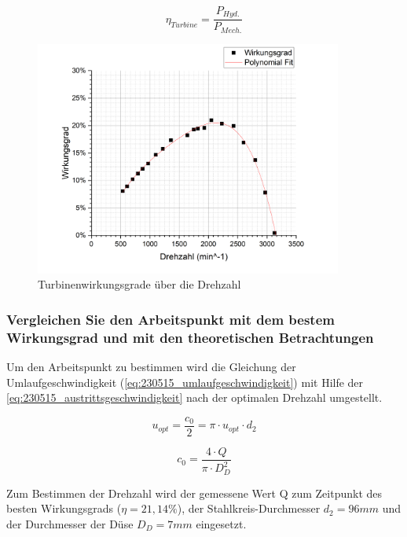 \begin{equation}
  \eta_{Turbine} = \frac{P_{Hyd.}}{P_{Mech.}}
  \label{eq:230512_Turbinenwirkungsgrad}
\end{equation}

\begin{figure}[H]
  \centering
  \includegraphics[width=0.9\textwidth]{Abbildungen/Wirkungsgrade.png}
  \caption{Turbinenwirkungsgrade über die Drehzahl}
  \label{fig:230514_Wirkungsgrade}
\end{figure}

\subsubsection{Vergleichen Sie den Arbeitspunkt mit dem bestem Wirkungsgrad und mit den theoretischen Betrachtungen}

Um den Arbeitspunkt zu bestimmen wird die Gleichung der Umlaufgeschwindigkeit (\autoref{eq:230515_umlaufgeschwindigkeit}) mit Hilfe der \autoref{eq:230515_austrittsgeschwindigkeit} nach der optimalen Drehzahl umgestellt.

\begin{equation}
  u_{opt} = \frac{c_{0}}{2}=\pi \cdot u_{opt} \cdot d_{2}
  \label{eq:230515_umlaufgeschwindigkeit}
\end{equation}


\begin{equation}
c_{0}=\frac{4 \cdot Q}{\pi \cdot D_{D}^2}
  \label{eq:230515_austrittsgeschwindigkeit}
\end{equation}

Zum Bestimmen der Drehzahl wird der gemessene Wert Q zum Zeitpunkt des besten Wirkungsgrads ($\eta=21,14\%$), der Stahlkreis-Durchmesser $d_{2} = 96mm$ und der Durchmesser der Düse $D_{D} = 7mm$ eingesetzt. 

